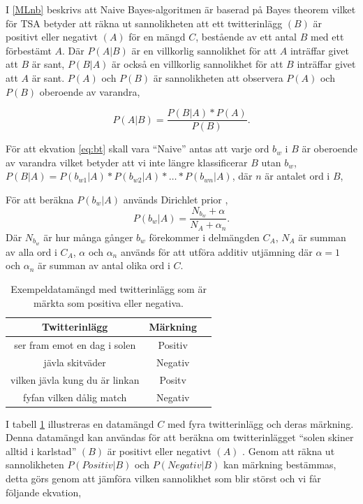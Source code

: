 \documentclass{kaumasters} %
\begin{document}
I \ref{MLnb} beskrivs att Naive Bayes-algoritmen är baserad på Bayes theorem \cite{wiki:009} vilket för TSA betyder att räkna ut sannolikheten att ett twitterinlägg $(B)$ är positivt eller negativt $(A)$ för en mängd $C$, bestående av ett antal $B$ med ett förbestämt $A$. Där $P(A | B)$ är en villkorlig sannolikhet för att $A$ inträffar givet att $B$ är sant, $P(B | A)$ är också en villkorlig sannolikhet för att $B$ inträffar givet att $A$ är sant. $P(A)$ och $P(B)$ är sannolikheten att observera $P(A)$ och $P(B)$ oberoende av varandra,

\begin{equation}\label{eq:bt}
P(A|B) = \frac{P(B|A) * P(A)}{P(B)}.
\end{equation}

För att ekvation \ref{eq:bt} skall vara “Naive” antas att varje ord $b_w$ i $B$ är oberoende av varandra vilket betyder att vi inte längre klassificerar $B$ utan $b_w$, $P(B|A) = P(b_{w1}|A) * P(b_{w2}|A) * … * P(b_{wn}|A)$, där $n$ är antalet ord i $B$,

För att beräkna $P(b_w|A)$ används Dirichlet prior \cite{wiki:012, nb:007}, 
\begin{equation}\label{eq:slut}
P(b_w|A)= \frac{N_{b_w} + \alpha}{N_A + \alpha_n}.
\end{equation}
Där $N_{b_w}$ är hur många gånger $b_w$ förekommer i delmängden $C_A$, 
$N_A$ är summan av alla ord i $C_A$, $\alpha$ och $\alpha_n$ används för att utföra additiv utjämning \cite{wiki:013} där $\alpha = 1$ och $\alpha_n$ är summan av antal olika ord i $C$.

\begin{table}[H]
\centering
\caption{Exempeldatamängd med twitterinlägg som är märkta som positiva eller negativa.}
\label{tab:dataset}
    \begin{tabular}{ccc}
    \toprule
    \textbf{Twitterinlägg} & \textbf{Märkning} \\
    \midrule
    ser fram emot en dag i solen & Positiv \\
    jävla skitväder & Negativ \\
    vilken jävla kung du är linkan & Positv \\
    fyfan vilken dålig match & Negativ \\
    \bottomrule
\end{tabular}
\end{table}

I tabell \ref{tab:dataset} illustreras en datamängd $C$ med fyra twitterinlägg och deras märkning. Denna datamängd kan användas för att beräkna om twitterinlägget “solen skiner alltid i karlstad” $(B)$ är positivt eller negativt $(A)$ . Genom att räkna ut sannolikheten $P(Positiv|B)$ och $P(Negativ|B)$ kan märkning bestämmas, detta görs genom att jämföra vilken sannolikhet som blir störst och vi får följande ekvation,
\end{document}

